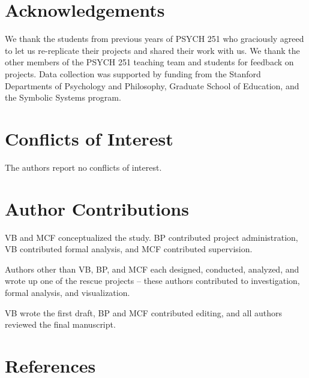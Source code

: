 \documentclass[
  english,
  a4paper,
]{article}
\begin{document}
\section*{Acknowledgements}\label{acknowledgements}

We thank the students from previous years of PSYCH 251 who graciously agreed to let us re-replicate their projects and shared their work with us.
We thank the other members of the PSYCH 251 teaching team and students for feedback on projects.
Data collection was supported by funding from the Stanford Departments of Psychology and Philosophy, Graduate School of Education, and the Symbolic Systems program.

\section*{Conflicts of Interest}\label{conflicts-of-interest}

The authors report no conflicts of interest.

\section*{Author Contributions}\label{author-contributions}

VB and MCF conceptualized the study.
BP contributed project administration, VB contributed formal analysis, and MCF contributed supervision.

Authors other than VB, BP, and MCF each designed, conducted, analyzed, and wrote up one of the rescue projects -- these authors contributed to investigation, formal analysis, and visualization.

VB wrote the first draft, BP and MCF contributed editing, and all authors reviewed the final manuscript.

\section*{References}\label{references}
\end{document}
